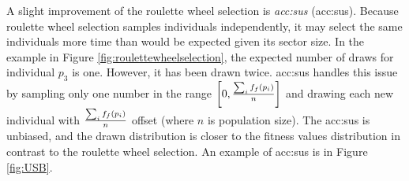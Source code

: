 A slight improvement of the roulette wheel selection is \emph{\acrlong*{acc:sus}} (\acrshort{acc:sus}). Because roulette wheel selection samples individuals independently, it may select the same individuals more time than would be expected given its sector size. In the example in Figure \ref{fig:roulettewheelselection}, the expected number of draws for individual $p_3$ is one. However, it has been drawn twice. \acrlong{acc:sus} handles this issue by sampling only one number in the range $\left[0,\frac{\sum_if_f(p_i)}{n} \right]$ and drawing each new individual with $\frac{\sum_if_f(p_i)}{n}$ offset (where $n$ is population size). The \acrshort{acc:sus} is unbiased, and the drawn distribution is closer to the fitness values distribution in contrast to the roulette wheel selection. An example of \acrshort{acc:sus} is in Figure \ref{fig:USB}.

